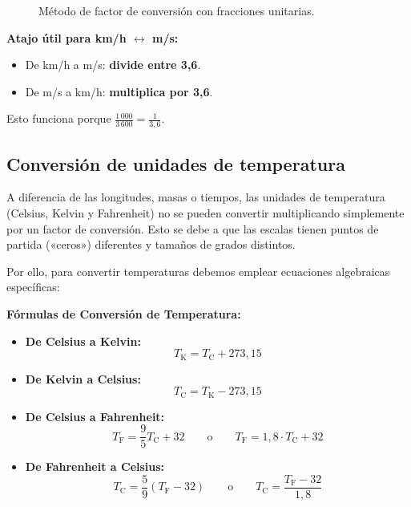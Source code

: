 \documentclass[12pt, letterpaper]{article}
\begin{document}
\begin{figure}[h!]
  \centering
  \caption{Método de factor de conversión con fracciones unitarias.}
  \label{fig:conversion}
\end{figure}

\begin{cuadroadvertencia}
  \textbf{Atajo útil para km/h $\leftrightarrow$ m/s:}
  \begin{itemize}
    \item De km/h a m/s: \textbf{divide entre 3,6}.
    \item De m/s a km/h: \textbf{multiplica por 3,6}.
  \end{itemize}
  Esto funciona porque $\frac{1\,000}{3\,600} = \frac{1}{3{,}6}$.
\end{cuadroadvertencia}


\subsection{Conversión de unidades de temperatura}

A diferencia de las longitudes, masas o tiempos, las unidades de temperatura (Celsius, Kelvin y Fahrenheit) no se pueden convertir multiplicando simplemente por un factor de conversión. Esto se debe a que las escalas tienen puntos de partida («ceros») diferentes y tamaños de grados distintos.

Por ello, para convertir temperaturas debemos emplear ecuaciones algebraicas específicas:

\newpage

\begin{cuadroteoria}
  \textbf{Fórmulas de Conversión de Temperatura:}
  \begin{itemize}[leftmargin=*]
    \item \textbf{De Celsius a Kelvin:}
          $$T_{\text{K}} = T_{\text{C}} + 273{,}15$$
    \item \textbf{De Kelvin a Celsius:}
          $$T_{\text{C}} = T_{\text{K}} - 273{,}15$$
    \item \textbf{De Celsius a Fahrenheit:}
          $$T_{\text{F}} = \frac{9}{5}T_{\text{C}} + 32 \qquad \text{o} \qquad T_{\text{F}} = 1{,}8 \cdot T_{\text{C}} + 32$$
    \item \textbf{De Fahrenheit a Celsius:}
          $$T_{\text{C}} = \frac{5}{9}(T_{\text{F}} - 32) \qquad \text{o} \qquad T_{\text{C}} = \frac{T_{\text{F}} - 32}{1{,}8}$$
  \end{itemize}
\end{cuadroteoria}
\end{document}
